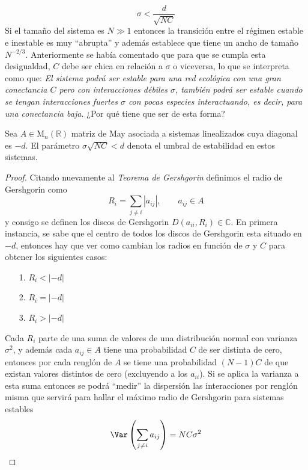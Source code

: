 $$\sigma<\frac{d}{\sqrt{NC}}$$
Si el tamaño del sistema es $N\gg 1$ entonces la transición entre el régimen estable e inestable es muy ``abrupta'' y además establece que tiene un ancho de tamaño $N^{-2/3}$. Anteriormente se había comentado que para que se cumpla esta desigualdad, $C$ debe ser chica en relación a $\sigma$ o viceversa, lo que se interpreta como que: \textit{El sistema podrá ser estable para una red ecológica con una gran conectancia $C$ pero con interacciones débiles $\sigma$, también podrá ser estable cuando se tengan interacciones fuertes $\sigma$ con pocas especies interactuando, es decir, para una conectancia baja.} ¿Por qué tiene que ser de esta forma?
\begin{proposición}\label{prop:paramMay}
	Sea $A\in\mathrm{M}_n(\mathbb{R})$ matriz de May asociada a sistemas linealizados cuya diagonal es $-d$. El parámetro $\sigma\sqrt{NC}<d$ denota el umbral de estabilidad en estos sistemas.
	\begin{proof}
		Citando nuevamente al \textit{Teorema de Gershgorin} \cite{GershgorinTheorem} definimos el radio de Gershgorin como
		\begin{equation}\label{proof2:RadioGersh}
			R_i=\sum_{j\neq i}|a_{ij}|,\qquad a_{ij}\in A
		\end{equation}
		y consigo se definen los discos de Gershgorin $D(a_{ii},R_i)\in\mathbb{C}$. En primera instancia, se sabe que el centro de todos los discos de Gershgorin esta situado en $-d$, entonces hay que ver como cambian los radios en función de $\sigma$ y $C$ para obtener los siguientes casos:
		\begin{itemize}
			\item [1.] $R_i<|-d|$
			\item [2.] $R_i=|-d|$
			\item [3.] $R_i>|-d|$
		\end{itemize}
		Cada $R_i$ parte de una suma de valores de una distribución normal con varianza $\sigma^2$, y además cada $a_{ij}\in A$ tiene una probabilidad $C$ de ser distinta de cero, entonces por cada renglón de $A$ se tiene una probabilidad $(N-1)C$ de que existan valores distintos de cero (excluyendo a los $a_{ii}$). Si se aplica la varianza a esta suma entonces se podrá ``medir'' la dispersión las interacciones por renglón misma que servirá para hallar el máximo radio de Gershgorin para sistemas estables
		\begin{equation}\label{proof2:Varianza}
			\Var\left (\sum_{j\neq i}a_{ij}\right )=NC\sigma^2
		\end{equation}

\end{proof}
\end{proposición}
